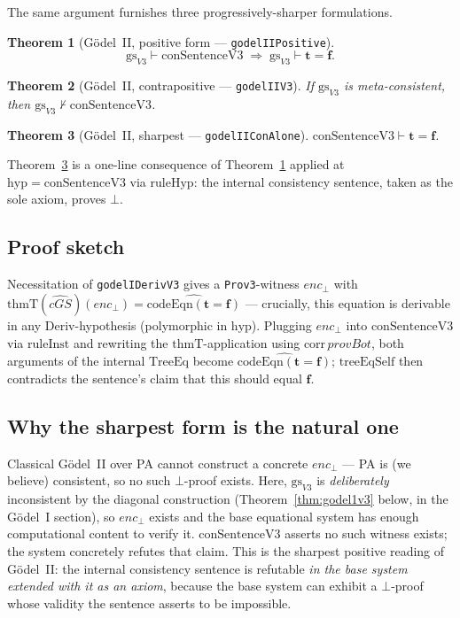 \documentclass[11pt]{article}
\newtheorem{theorem}{Theorem}
\newcommand{\trueT}{\mathbf{t}}
\newcommand{\falseT}{\mathbf{f}}
\newcommand{\reify}[1]{\widehat{#1}}
\newcommand{\thmT}{\mathrm{thmT}}
\newcommand{\TreeEq}{\mathrm{TreeEq}}
\begin{document}
The same argument furnishes three progressively-sharper formulations.

\begin{theorem}[G\"odel~II, positive form --- \texttt{godelIIPositive}]
\label{thm:g2pos}
\[
  \mathrm{gs}_{V3} \vdash \mathrm{conSentenceV3}
  \;\Longrightarrow\;
  \mathrm{gs}_{V3} \vdash \trueT = \falseT.
\]
\end{theorem}

\begin{theorem}[G\"odel~II, contrapositive --- \texttt{godelIIV3}]
If $\mathrm{gs}_{V3}$ is meta-consistent, then
$\mathrm{gs}_{V3} \not\vdash \mathrm{conSentenceV3}$.
\end{theorem}

\begin{theorem}[G\"odel~II, sharpest --- \texttt{godelIIConAlone}]
\label{thm:g2sharp}
$\mathrm{conSentenceV3} \vdash \trueT = \falseT$.
\end{theorem}

Theorem~\ref{thm:g2sharp} is a one-line consequence of
Theorem~\ref{thm:g2pos} applied at $\mathrm{hyp} = \mathrm{conSentenceV3}$
via $\mathrm{ruleHyp}$: the internal consistency sentence, taken as the
sole axiom, proves $\bot$.

\subsection*{Proof sketch}

Necessitation of \texttt{godelIDerivV3} gives a \texttt{Prov3}-witness
$enc_\bot$ with $\thmT(\reify{cGS})(enc_\bot) = \reify{\mathrm{codeEqn}(\trueT=\falseT)}$
--- crucially, this equation is derivable in any Deriv-hypothesis
(polymorphic in $\mathrm{hyp}$).  Plugging $enc_\bot$ into
$\mathrm{conSentenceV3}$ via $\mathrm{ruleInst}$ and rewriting the
$\thmT$-application using $\mathrm{corr}\,\mathit{provBot}$, both
arguments of the internal $\TreeEq$ become
$\reify{\mathrm{codeEqn}(\trueT=\falseT)}$; $\mathrm{treeEqSelf}$ then
contradicts the sentence's claim that this should equal $\falseT$.

\subsection*{Why the sharpest form is the natural one}

Classical G\"odel~II over PA cannot construct a concrete
$enc_\bot$ --- PA is (we believe) consistent, so no such $\bot$-proof
exists.  Here, $\mathrm{gs}_{V3}$ is \emph{deliberately} inconsistent by
the diagonal construction (Theorem~\ref{thm:godel1v3} below, in the
Gödel~I section), so $enc_\bot$ exists and the base equational system
has enough computational content to verify it.
$\mathrm{conSentenceV3}$ asserts no such witness exists; the system
concretely refutes that claim.  This is the sharpest
positive reading of G\"odel~II: the internal consistency sentence is
refutable \emph{in the base system extended with it as an axiom},
because the base system can exhibit a $\bot$-proof whose validity the
sentence asserts to be impossible.
\end{document}
